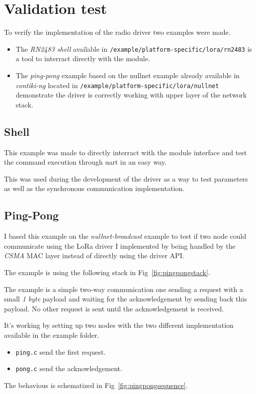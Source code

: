
\section{Validation test}

To verify the implementation of the radio driver two examples were made.

\begin{itemize}
  \item The \emph{RN2483 shell} available in
    \lstinline{/example/platform-specific/lora/rn2483} is a tool to interract
    directly with the module.
  \item The \emph{ping-pong} example based on the nullnet example already
    available in \emph{contiki-ng} located in 
    \lstinline{/example/platform-specific/lora/nullnet} demonstrate the driver
    is correctly working with upper layer of the network stack.
\end{itemize}

\subsection{Shell}

This example was made to directly interract with the module interface and test
the command execution through uart in an easy way.

This was used during the development of the driver as a way to test parameters
as well as the synchronous communication implementation.

\subsection{Ping-Pong}

I based this example on the \emph{nullnet-broadcast} example to test if two
node could communicate using the LoRa driver I implemented by being handled by
the \emph{CSMA} MAC layer instead of directly using the driver API\@.

The example is using the following stack in Fig~\ref{fig:pingpongstack}.



The example is a simple two-way communication one sending a request with a
small \emph{1 byte} payload and waiting for the acknowledgement by sending back
this payload. No other request is sent until the acknowledgement is received.

It's working by setting up two nodes with the two different implementation 
available in the example folder.

\begin{itemize}
  \item \lstinline{ping.c} send the first request.
  \item \lstinline{pong.c} send the acknowledgement.
\end{itemize}

The behavious is schematized in Fig~\ref{fig:pingpongsequence}.


